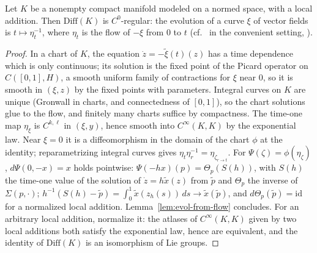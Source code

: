 \begin{theorem}
  \label{thm:diff-regular}
  \leanok
  Let $K$ be a nonempty compact manifold modeled on a normed space, with a local addition.
  Then $\mathrm{Diff}(K)$ is $C^0$-regular: the evolution of a curve $\xi$ of vector
  fields is $t \mapsto \eta_t^{-1}$, where $\eta_t$ is the flow of $-\xi$ from $0$ to $t$
  (cf.\ \cite[Theorem 43.1]{KM97} in the convenient setting, \cite[Theorem III.3.1]{Nee06}).
\end{theorem}

\begin{proof}
  \leanok
  In a chart of $K$, the equation $\dot z = -\tilde\xi(t)(z)$ has a time dependence which is only
  continuous; its solution is the fixed point of the Picard operator on $C([0, 1], H)$, a smooth
  uniform family of contractions for $\xi$ near $0$, so it is smooth in $(\xi, z)$ by the fixed
  points with parameters. Integral curves on $K$ are unique (Gronwall in charts, and
  connectedness of $[0, 1]$), so the chart solutions glue to the flow, and finitely many charts
  suffice by compactness. The time-one map $\eta_\xi$ is $C^{k, \ell}$ in $(\xi, y)$, hence smooth
  into $C^\infty(K, K)$ by the exponential law. Near $\xi = 0$ it is a diffeomorphism in the domain
  of the chart $\phi$ at the identity; reparametrizing integral curves gives
  $\eta_t\eta_r^{-1} = \eta_{\zeta_{r \to t}}$. For $\Psi(\zeta) = \phi(\eta_\zeta)$,
  $d\Psi(0, -x) = x$ holds pointwise: $\Psi(-h x)(p) = \Theta_p(S(h))$, with $S(h)$ the time-one
  value of the solution of $\dot z = h\tilde x(z)$ from $\tilde p$ and $\Theta_p$ the inverse of
  $\Sigma(p, \cdot)$; $h^{-1}(S(h) - \tilde p) = \int_0^1 \tilde x(z_h(s))\,ds \to \tilde x(\tilde p)$,
  and $d\Theta_p(\tilde p) = \mathrm{id}$ for a normalized local addition.
  Lemma~\ref{lem:evol-from-flow} concludes. For an arbitrary local addition, normalize it: the
  atlases of $C^\infty(K, K)$ given by two local additions both satisfy the exponential law, hence
  are equivalent, and the identity of $\mathrm{Diff}(K)$ is an isomorphism of Lie groups.
\end{proof}

